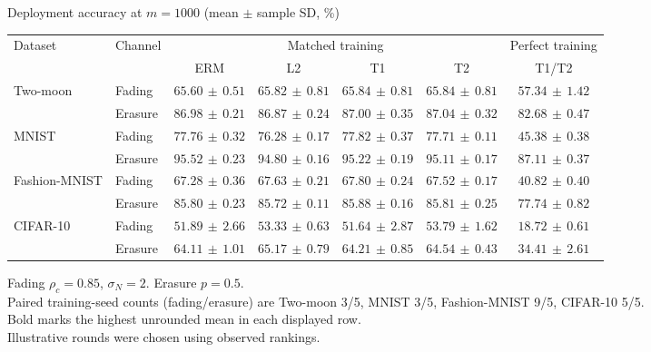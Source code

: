 \documentclass[border=4pt]{standalone}
\begin{document}
\begin{minipage}{7.8in}
\centering
Deployment accuracy at $m=1000$ (mean $\pm$ sample SD, \%)\\[4pt]
\begin{tabular*}{\linewidth}{@{\extracolsep{\fill}}llccccc@{}}
\toprule
\multirow{2}{*}{Dataset} & \multirow{2}{*}{Channel} & \multicolumn{4}{c}{Matched training} & Perfect training \\
\cmidrule(lr){3-6}\cmidrule(l){7-7}
 & & ERM & L2 & T1 & T2 & T1/T2 \\
\midrule
\multirow{2}{*}{Two-moon} & Fading & $65.60\,\pm\,0.51$ & $65.82\,\pm\,0.81$ & $\mathbf{65.84}\,\pm\,0.81$ & $65.84\,\pm\,0.81$ & $57.34\,\pm\,1.42$ \\
 & Erasure & $86.98\,\pm\,0.21$ & $86.87\,\pm\,0.24$ & $87.00\,\pm\,0.35$ & $\mathbf{87.04}\,\pm\,0.32$ & $82.68\,\pm\,0.47$ \\
\midrule[0.25pt]
\multirow{2}{*}{MNIST} & Fading & $77.76\,\pm\,0.32$ & $76.28\,\pm\,0.17$ & $\mathbf{77.82}\,\pm\,0.37$ & $77.71\,\pm\,0.11$ & $45.38\,\pm\,0.38$ \\
 & Erasure & $\mathbf{95.52}\,\pm\,0.23$ & $94.80\,\pm\,0.16$ & $95.22\,\pm\,0.19$ & $95.11\,\pm\,0.17$ & $87.11\,\pm\,0.37$ \\
\midrule[0.25pt]
\multirow{2}{*}{Fashion-MNIST} & Fading & $67.28\,\pm\,0.36$ & $67.63\,\pm\,0.21$ & $\mathbf{67.80}\,\pm\,0.24$ & $67.52\,\pm\,0.17$ & $40.82\,\pm\,0.40$ \\
 & Erasure & $85.80\,\pm\,0.23$ & $85.72\,\pm\,0.11$ & $\mathbf{85.88}\,\pm\,0.16$ & $85.81\,\pm\,0.25$ & $77.74\,\pm\,0.82$ \\
\midrule[0.25pt]
\multirow{2}{*}{CIFAR-10} & Fading & $51.89\,\pm\,2.66$ & $53.33\,\pm\,0.63$ & $51.64\,\pm\,2.87$ & $\mathbf{53.79}\,\pm\,1.62$ & $18.72\,\pm\,0.61$ \\
 & Erasure & $64.11\,\pm\,1.01$ & $\mathbf{65.17}\,\pm\,0.79$ & $64.21\,\pm\,0.85$ & $64.54\,\pm\,0.43$ & $34.41\,\pm\,2.61$ \\
\bottomrule
\end{tabular*}
\par\smallskip\raggedright\footnotesize
Fading $\rho_c=0.85$, $\sigma_N=2$. Erasure $p=0.5$.\\
Paired training-seed counts (fading/erasure) are Two-moon 3/5, MNIST 3/5, Fashion-MNIST 9/5, CIFAR-10 5/5.\\
Bold marks the highest unrounded mean in each displayed row.\\
Illustrative rounds were chosen using observed rankings.
\end{minipage}
\end{document}
